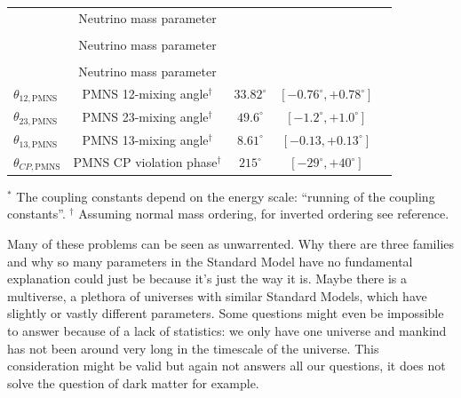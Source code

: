 \begin{table}[]
{\begin{tabular}{|l|c|c|c|c|}
\cellcolor[HTML]{F1A91E}\multirow{-2}{*}{$m_{\nu1}$} &\multirow{-2}{*}{Neutrino mass parameter}&&&\\
\cellcolor[HTML]{F1A91E}  &     &       & & \\
\cellcolor[HTML]{F1A91E}\multirow{-2}{*}{$m_{\nu2}$} &\multirow{-2}{*}{Neutrino mass parameter}&&&\\ 
\cellcolor[HTML]{F1A91E} &   &       & & \\ 
\cellcolor[HTML]{F1A91E}\multirow{-2}{*}{$m_{\nu3}$} &\multirow{-2}{*}{Neutrino mass parameter}&&&\\
\hline
\cellcolor[HTML]{F1A91E}$\theta_{12,\textrm{PMNS}}$  &  PMNS 12-mixing angle$^\dagger$ & $33.82^{\circ}$ & $\left[-0.76^\circ, +0.78^\circ \right]$ & \cite{Esteban:2016qun,nufit2018}\\ \hline
\cellcolor[HTML]{F1A91E}$\theta_{23,\textrm{PMNS}}$  &  PMNS 23-mixing angle$^\dagger$ &
$49.6^{\circ}$ & $\left[-1.2^\circ, +1.0^\circ\right]$ & \cite{Esteban:2016qun,nufit2018}\\ \hline\cellcolor[HTML]{F1A91E}$\theta_{13,\textrm{PMNS}}$  &  PMNS 13-mixing angle$^\dagger$ &$8.61^{\circ}$ & $\left[-0.13,+0.13^\circ\right]$ & \cite{Esteban:2016qun,nufit2018}\\ \hline
\cellcolor[HTML]{F1A91E}$\theta_{CP,\textrm{PMNS}}$  &  PMNS CP violation phase$^\dagger$ &  $215^{\circ}$ & $\left[-29^\circ,+40^\circ \right]$ & \cite{Esteban:2016qun,nufit2018} \\ \hline
\end{tabular}%
}
$^*$ The coupling constants depend on the energy scale: ``running of the coupling constants''.
$^\dagger $ Assuming normal mass ordering, for inverted ordering see reference.
\end{table}
\vspace{2mm}


\noindent Many of these problems can be seen as unwarrented. Why there are three families and why so many parameters in the Standard Model have no fundamental explanation could just be because it's just the way it is. Maybe there is a multiverse, a plethora of universes with similar Standard Models, which have slightly or vastly different parameters. Some questions might even be impossible to answer because of a lack of statistics: we only have one universe and mankind has not been around very long in the timescale of the universe. This consideration might be valid but again not answers all our questions, it does not solve the question of dark matter for example.

